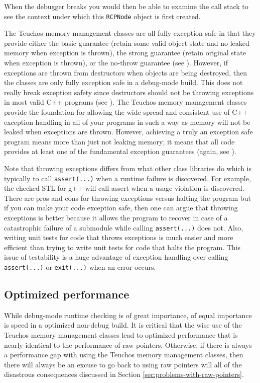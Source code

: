 \documentclass[pdf,ps2pdf,11pt]{SANDreport}
\begin{document}
When the debugger breaks you would then be able to examine the call
stack to see the context under which this {}\texttt{RCPNode} object is
first created.

The Teuchos memory management classes are all fully exception safe in
that they provide either the basic guarantee (retain some valid object
state and no leaked memory when exception is thrown), the strong
guarantee (retain original state when exception is thrown), or the
no-throw guarantee (see {}\cite[Item 71]{C++CodingStandards05}).
However, if exceptions are thrown from destructors when objects are
being destroyed, then the classes are only fully exception safe in a
debug-mode build.  This does not really break exception safety since
destructors should not be throwing exceptions in most valid C++
programs (see {}\cite[Item 51]{C++CodingStandards05}).  The Teuchos
memory management classes provide the foundation for allowing the
wide-spread and consistent use of C++ exception handling in all of
your programs in such a way as memory will not be leaked when
exceptions are thrown.  However, achieving a truly an exception safe
program means more than just not leaking memory; it means that all
code provides at least one of the fundamental exception guarantees
(again, see {}\cite[Item 71]{C++CodingStandards05}).

Note that throwing exceptions differs from what other class libraries
do which is typically to call {}\texttt{assert(...)} when a runtime
failure is discovered.  For example, the checked STL for g++ will call
assert when a usage violation is discovered.  There are pros and cons
for throwing exceptions versus halting the program but if you can make
your code exception safe, then one can argue that throwing exceptions
is better because it allows the program to recover in case of a
catastrophic failure of a submodule while calling
{}\texttt{assert(...)} does not.  Also, writing unit tests for code
that throws exceptions is much easier and more efficient than trying
to write unit tests for code that halts the program.  This issue of
testability is a huge advantage of exception handling over calling
{}\texttt{assert(...)} or {}\texttt{exit(...)} when an error occurs.


%
{}\subsection{Optimized performance}
%

While debug-mode runtime checking is of great importance, of equal
importance is speed in a optimized non-debug build.  It is critical
that the wise use of the Teuchos memory management classes lead to
optimized performance that is nearly identical to the performance of
raw pointers.  Otherwise, if there is always a performance gap with
using the Teuchos memory management classes, then there will always be
an excuse to go back to using raw pointers will all of the disastrous
consequences discussed in Section
{}\ref{sec:problems-with-raw-pointers}.
\end{document}
